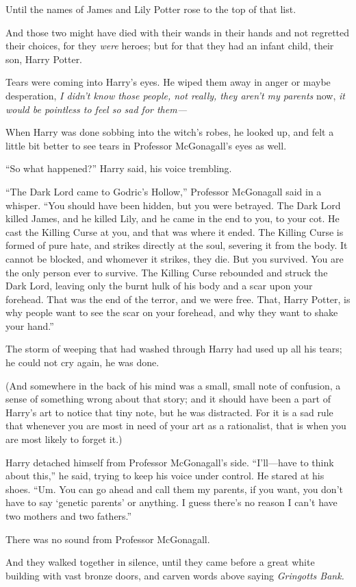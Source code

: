 Until the names of James and Lily Potter rose to the top of that list.

And those two might have died with their wands in their hands and not
regretted their choices, for they \emph{were} heroes; but for that they
had an infant child, their son, Harry Potter.

Tears were coming into Harry's eyes. He wiped them away in anger or
maybe desperation, \emph{I didn't know those people, not really, they
aren't my parents} now, \emph{it would be pointless to feel so sad for
them---}

When Harry was done sobbing into the witch's robes, he looked up, and
felt a little bit better to see tears in Professor McGonagall's eyes as
well.

``So what happened?'' Harry said, his voice trembling.

``The Dark Lord came to Godric's Hollow,'' Professor McGonagall said in
a whisper. ``You should have been hidden, but you were betrayed. The
Dark Lord killed James, and he killed Lily, and he came in the end to
you, to your cot. He cast the Killing Curse at you, and that was where
it ended. The Killing Curse is formed of pure hate, and strikes directly
at the soul, severing it from the body. It cannot be blocked, and
whomever it strikes, they die. But you survived. You are the only person
ever to survive. The Killing Curse rebounded and struck the Dark Lord,
leaving only the burnt hulk of his body and a scar upon your forehead.
That was the end of the terror, and we were free. That, Harry Potter, is
why people want to see the scar on your forehead, and why they want to
shake your hand.''

The storm of weeping that had washed through Harry had used up all his
tears; he could not cry again, he was done.

(And somewhere in the back of his mind was a small, small note of
confusion, a sense of something wrong about that story; and it should
have been a part of Harry's art to notice that tiny note, but he was
distracted. For it is a sad rule that whenever you are most in need of
your art as a rationalist, that is when you are most likely to forget
it.)

Harry detached himself from Professor McGonagall's side. ``I'll---have
to think about this,'' he said, trying to keep his voice under control.
He stared at his shoes. ``Um. You can go ahead and call them my parents,
if you want, you don't have to say `genetic parents' or anything. I
guess there's no reason I can't have two mothers and two fathers.''

There was no sound from Professor McGonagall.

And they walked together in silence, until they came before a great
white building with vast bronze doors, and carven words above saying
\emph{Gringotts Bank.}
